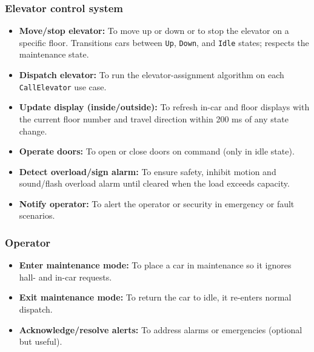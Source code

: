\subsubsection{Elevator control system}\label{HQK9hvA95tF3wQO315nI0}

\begin{itemize}
\item
\protect{}\label{3JuLKtgglM9ZxfSDDCoin}
\textbf{Move/stop elevator:} To move up or down or to stop the elevator on a specific floor. Transitions cars between \texttt{Up}, \texttt{Down}, and \texttt{Idle} states; respects the maintenance state.
\item
\protect{}\label{4KADT-EkNp5hGhJGOqlsz}
\textbf{Dispatch elevator:} To run the elevator-assignment algorithm on each \texttt{CallElevator} use case.
\item
\protect{}\label{lXJWW5Vh0QZiwYAQq6FYr}
\textbf{Update display (inside/outside):} To refresh in-car and floor displays with the current floor number and travel direction within 200 ms of any state change.
\item
\protect{}\label{CvcohU-03mHUXAy5o4S1A}
\textbf{Operate doors:} To open or close doors on command (only in idle state).
\item
\protect{}\label{KRV5Fwg4gdAGSNjAuOCr_}
\textbf{Detect overload/sign alarm:} To ensure safety, inhibit motion and sound/flash overload alarm until cleared when the load exceeds capacity.
\item
\protect{}\label{CvcohU-03mHUXAy5o4S1A}
\textbf{Notify operator:} To alert the operator or security in emergency or fault scenarios.
\end{itemize}

\subsubsection{Operator}\label{vnigYXVhb6GFo7G5KwqiG}

\begin{itemize}
\item
\protect{}\label{xXv0ekQvwZ7UDWWQ2FGW6}
\textbf{Enter maintenance mode:} To place a car in maintenance so it ignores hall- and in-car requests.
\item
\protect{}\label{y3AN24hhjFgG-8U85-I7U}
\textbf{Exit maintenance mode:} To return the car to idle, it re-enters normal dispatch.
\item
\protect{}\label{ZN0OfWYTWN2bptbp6GCZd}
\textbf{Acknowledge/resolve alerts:} To address alarms or emergencies (optional but useful).
\end{itemize}

